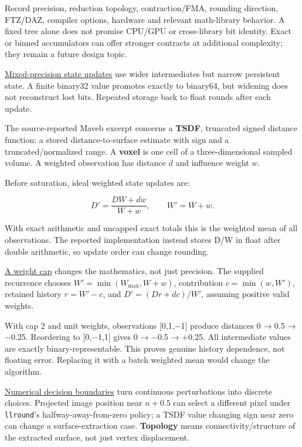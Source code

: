 Record precision, reduction topology, contraction/FMA, rounding direction, FTZ/DAZ, compiler options, hardware and relevant math-library behavior. A fixed tree alone does not promise CPU/GPU or cross-library bit identity. Exact or binned accumulators can offer stronger contracts at additional complexity; they remain a future design topic.

\hyperref[appendix-260182e617b7]{Mixed-precision state updates} use wider intermediates but narrow persistent state. A finite binary32 value promotes exactly to binary64, but widening does not reconstruct lost bits. Repeated storage back to float rounds after each update.

The source-reported Maveb excerpt concerns a \textbf{TSDF}, truncated signed distance function: a stored distance-to-surface estimate with sign and a truncated/normalized range. A \textbf{voxel} is one cell of a three-dimensional sampled volume. A weighted observation has distance \(d\) and influence weight \(w\).

Before saturation, ideal weighted state updates are:

\[
D'=\frac{DW+dw}{W+w},\qquad W'=W+w.
\]

With exact arithmetic and uncapped exact totals this is the weighted mean of all observations. The reported implementation instead stores D/W in float after double arithmetic, so update order can change rounding.

\hyperref[appendix-1e45d0613db3]{A weight cap} changes the mathematics, not just precision. The supplied recurrence chooses \(W'=\min(W_{\max},W+w)\), contribution \(c=\min(w,W')\), retained history \(r=W'-c\), and \(D'=(Dr+dc)/W'\), assuming positive valid weights.

With cap 2 and unit weights, observations {[}0,1,−1{]} produce distances 0 → 0.5 → −0.25. Reordering to {[}0,−1,1{]} gives 0 → −0.5 → +0.25. All intermediate values are exactly binary-representable. This proves genuine history dependence, not floating error. Replacing it with a batch weighted mean would change the algorithm.

\hyperref[appendix-c80db39080be]{Numerical decision boundaries} turn continuous perturbations into discrete choices. Projected image position near \(n+0.5\) can select a different pixel under \texttt{llround}'s halfway-away-from-zero policy; a TSDF value changing sign near zero can change a surface-extraction case. \textbf{Topology} means connectivity/structure of the extracted surface, not just vertex displacement.

